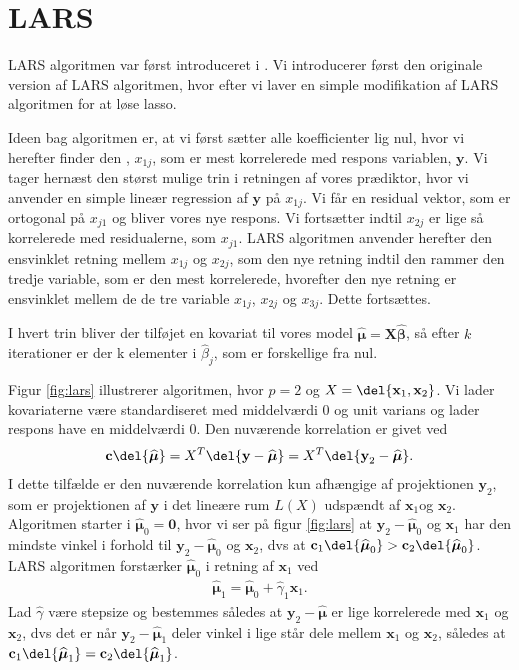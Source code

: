 \section{LARS}
LARS algoritmen var først introduceret i \citep{efron}.  
Vi introducerer først den originale version af LARS algoritmen, hvor efter vi laver en simple modifikation af LARS algoritmen for at løse lasso. 

Ideen bag algoritmen er, at vi først sætter alle koefficienter lig nul, hvor vi herefter finder den , $x_{1j}$, som er mest korrelerede med respons variablen, $\textbf{y}$.  
Vi tager hernæst den størst mulige trin i retningen af vores prædiktor, hvor vi anvender en simple lineær regression af $\textbf{y}$ på $x_{1j}$. 
Vi får en residual vektor, som er ortogonal på $x_{j1}$ og bliver vores nye respons. 
Vi fortsætter indtil $x_{2j}$ er lige så korrelerede  med residualerne, som $x_{j1}$. 
LARS algoritmen anvender herefter den ensvinklet retning mellem $x_{1j}$ og $x_{2j}$, som den nye retning indtil den rammer den tredje variable, som er den mest korrelerede, hvorefter den nye retning er ensvinklet mellem de de tre variable $x_{1j}$, $x_{2j}$ og $x_{3j}$. Dette fortsættes. 

I hvert trin bliver der tilføjet en kovariat til vores model $\widehat{\boldsymbol{\mu}} = \textbf{X} \widehat{\boldsymbol{ \beta}}$, så efter $k$ iterationer er der k elementer i  $\widehat{\beta}_j$, som er forskellige fra nul.  

Figur \ref{fig:lars} illustrerer algoritmen, hvor $p = 2$ og $X = \del{\textbf{x}_1, \textbf{x}_2}$. 
Vi lader kovariaterne være standardiseret med middelværdi 0 og unit varians og lader respons have en middelværdi 0. Den nuværende korrelation er givet ved 
\begin{align*}
\textbf{c}\del{\boldsymbol{\widehat{\mu}}} = X^T\del{\textbf{y} - \widehat{\boldsymbol{\mu}}} = X^T \del{ \textbf{y}_2 - \boldsymbol{\widehat{\mu}}}.
\end{align*}
I dette tilfælde er den nuværende korrelation kun afhængige af projektionen $\textbf{y}_2 $, som er projektionen af $\textbf{y}$ i det lineære rum $L(X)$ udspændt af $ \textbf{x}_1 $og $\textbf{x}_2$. 
Algoritmen starter i $\widehat{\boldsymbol{\mu}}_0 = \textbf{0}$, hvor vi ser på figur \ref{fig:lars} at $ \textbf{y}_2 - \boldsymbol{\widehat{\mu}}_0$ og $\textbf{x}_1$ har den mindste vinkel i forhold til $ \textbf{y}_2 - \boldsymbol{\widehat{\mu}}_0$  og $\textbf{x}_2$, dvs at $\textbf{c}_1\del{\boldsymbol{\widehat{\mu}}_0} > \textbf{c}_2\del{\boldsymbol{\widehat{\mu}}_0}$. 
LARS algoritmen forstærker  $\boldsymbol{\widehat{\mu}}_0$ i retning af $\textbf{x}_1$ ved
%
 \begin{align*}
 \boldsymbol{\widehat{\mu}}_1 = \boldsymbol{\widehat{\mu}}_0 + \widehat{\gamma}_1 \textbf{x}_1.
 \end{align*}
 Lad $\widehat{\gamma}$ være stepsize og bestemmes  således at $ \textbf{y}_2 - \boldsymbol{\widehat{\mu}}$ er lige korrelerede med $\textbf{x}_1$ og $\textbf{x}_2$, dvs det er når  $\textbf{y}_2 - \boldsymbol{\widehat{\mu}}_1$ deler vinkel i lige står dele mellem  $\textbf{x}_1$ og $\textbf{x}_2$, således at $\textbf{c}_1\del{\boldsymbol{\widehat{\mu}}_1} = \textbf{c}_2\del{\boldsymbol{\widehat{\mu}}_1}$.  
 
